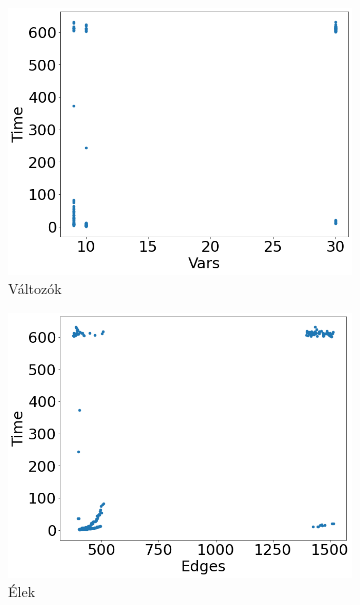 \begin{figure}[ht] 
	\begin{subfigure}[b]{0.5\linewidth}
		\centering
		\includegraphics[width=0.95\linewidth]{figures/eca/vars.png} 
		\caption{Változók} 
		\vspace{4ex}
	\end{subfigure}%
	\begin{subfigure}[b]{0.5\linewidth}
		\centering
		\includegraphics[width=0.95\linewidth]{figures/eca/edges.png} 
		\caption{Élek} 
		\vspace{4ex}
	\end{subfigure} 
	\begin{subfigure}[b]{0.5\linewidth}
		\centering

\end{subfigure}
\end{figure}
